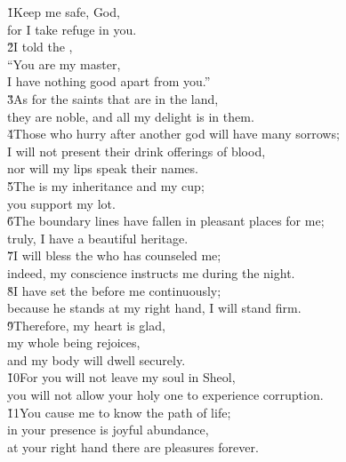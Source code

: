 \begin{poetry}
\poeml \v{1}Keep me safe, God, \\
\poemll    for I take refuge in you. \\
\poeml \v{2}I told the , \\
\poemll    ``You are my master, \\
\poemlll       I have nothing good apart from you.'' \\
\poeml \v{3}As for the saints that are in the land, \\
\poemll    they are noble, and all my delight is in them. \\
\poeml \v{4}Those who hurry after another god will have many sorrows; \\
\poemll    I will not present their drink offerings of blood, \\
\poemlll       nor will my lips speak their names. \\
\poeml \v{5}The  is my inheritance and my cup; \\
\poemll    you support my lot. \\
\poeml \v{6}The boundary lines have fallen in pleasant places for me; \\
\poemll    truly, I have a beautiful heritage. \\
\poeml \v{7}I will bless the  who has counseled me; \\
\poemll    indeed, my conscience instructs me during the night. \\
\poeml \v{8}I have set the  before me continuously; \\
\poemll    because he stands at my right hand, I will stand firm. \\
\poeml \v{9}Therefore, my heart is glad, \\
\poemll    my whole being rejoices, \\
\poemlll       and my body will dwell securely. \\
\poeml \v{10}For you will not leave my soul in Sheol, \\
\poemll    you will not allow your holy one to experience corruption. \\
\poeml \v{11}You cause me to know the path of life; \\
\poemll    in your presence is joyful abundance, \\
\poemlll       at your right hand there are pleasures forever.
\end{poetry}

